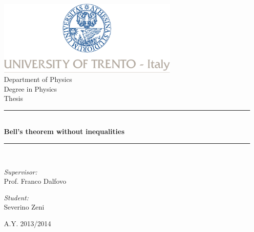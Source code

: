 \begin{titlepage}

\begin{center}

\includegraphics[width=9cm]{Frontmatter/Cover/logo-unitn.jpg}\\[0.4cm]

{\LARGE Department of Physics}\\[4.5cm]

{\Large Degree in Physics}\\[0.5cm]

{\Large Thesis}\\[0.5cm]

\rule{\linewidth}{0.2mm} \\[0.5cm]

{ \huge \bfseries Bell's theorem without inequalities \\[0.5cm] }

\rule{\linewidth}{0.2mm} \\[2cm]

\begin{minipage}{0.4\textwidth}
\begin{flushleft} \large
\emph{Supervisor:} \\[0.25cm]
Prof. Franco Dalfovo
\end{flushleft}
\end{minipage}
\begin{minipage}{0.4\textwidth}
\begin{flushright} \large
\emph{Student:}\\[0.25cm]
Severino Zeni
\end{flushright}

\end{minipage}

\vfill

{\large A.Y. 2013/2014}

\end{center}

\restoregeometry
\end{titlepage}

